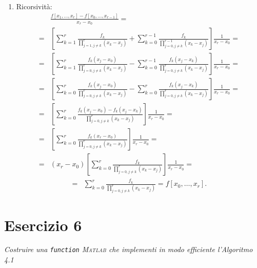 \begin{sol}
\begin{enumerate}
		\item Ricorsività: \begin{equation*}\begin{split}\:&\frac{f[x_1,\ldots,x_r]-f[x_0,\ldots,x_{r-1}]}{x_r-x_0}=\\=&\left[\sum_{k=1}^r{\frac{f_k}{\prod_{j=1,j\neq k}^r(x_k-x_j)}} + \sum_{k=0}^{r-1}{\frac{f_k}{\prod_{j=0,j\neq k}^{r-1}(x_k-x_j)}}\right]\frac{1}{x_r-x_0} = \\ =&\left[\sum_{k=1}^r{\frac{f_k(x_j-x_0)}{\prod_{j=0,j\neq k}^r(x_k-x_j)}} - \sum_{k=0}^{r-1}{\frac{f_k(x_j-x_k)}{\prod_{j=0,j\neq k}^r(x_k-x_j)}}\right]\frac{1}{x_r-x_0} = \\=&\left[\sum_{k=0}^r{\frac{f_k(x_j-x_0)}{\prod_{j=0,j\neq k}^r(x_k-x_j)}} - \sum_{k=0}^{r}{\frac{f_k(x_j-x_k)}{\prod_{j=0,j\neq k}^r(x_k-x_j)}}\right]\frac{1}{x_r-x_0} = \\=& \left[\sum_{k=0}^r{\frac{f_k(x_j-x_0)-f_k(x_j-x_k)}{\prod_{j=0,j\neq k}^r(x_k-x_j)}}\right]\frac{1}{x_r-x_0}  =\\=&
	\left[\sum_{k=0}^r{\frac{f_k(x_r-x_0)}{\prod_{j=0,j\neq k}^r(x_k-x_j)}}\right]\frac{1}{x_r-x_0}= \\=&(x_r-x_0)\left[\sum_{k=0}^r{\frac{f_k}{\prod_{j=0,j\neq k}^r(x_k-x_j)}}\right]\frac{1}{x_r-x_0}= \end{split}\end{equation*}
	\newpage\begin{equation*}\begin{split}=&\sum_{k=0}^r{\frac{f_k}{\prod_{j=0,j\neq k}^r(x_k-x_j)}} = f[x_0,\ldots,x_r].\end{split}\end{equation*}
	\end{enumerate}
\end{sol}


\section{Esercizio 6}
\label{sub:Esercizio 6}
\emph{Costruire una \lstinline{function} \textsc{Matlab} che implementi in modo efficiente l'Algoritmo 4.1}
\begin{sol}
	
\end{sol}

